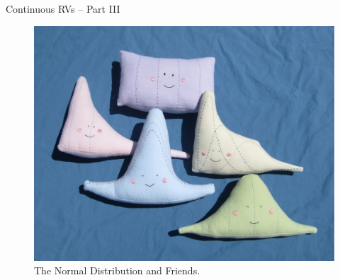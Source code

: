 \documentclass[handout]{beamer}
\date{Lecture \# 13}
\begin{document}
 


\begin{frame}[plain]
	\titlepage 
	

\end{frame} 

\begin{frame}
\Huge \begin{center}
Continuous RVs -- Part III
\end{center}
\end{frame}
\begin{frame}
\begin{figure}
\includegraphics[scale = 0.2]{./images/normal_friends}
\caption{The Normal Distribution and Friends.}
\end{figure}
\end{frame}
\end{document}
